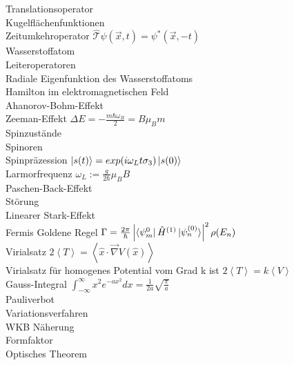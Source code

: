 \documentclass{article}
\begin{document}
Translationsoperator \\

Kugelfl\"achenfunktionen \\

Zeitumkehroperator $\hat{\mathcal{T}}\psi(\vec{x}, t) = \psi^*(\vec{x}, -t)$\\

Wasserstoffatom \\

Leiteroperatoren \\

Radiale Eigenfunktion des Wasserstoffatoms \\

Hamilton im elektromagnetischen Feld \\

Ahanorov-Bohm-Effekt \\

Zeeman-Effekt $\Delta E = - \frac{m \hbar \omega_B}{2} = B \mu_B m$ \\

Spinzust\"ande \\

Spinoren \\

Spinpr\"azession $\ket{s(t)} = exp(i \omega_L t \sigma_3) \ket{s(0)} $ \\

Larmorfrequenz $\omega_L := \frac{g}{2 \hbar} \mu_B B$ \\

Paschen-Back-Effekt \\

St\"orung \\

Linearer Stark-Effekt \\

Fermis Goldene Regel $\Gamma = \frac{2\pi}{\hbar} \left| \bra{\psi_m^{0}} \hat{H}^{(1)} \ket{\psi_n^{(0)}} \right|^2 \rho(E_n) $\\

Virialsatz $2 \left< T \right> = \left< \hat{x} \cdot \vec{\nabla}V(\hat{x}) \right> $ \\

Virialsatz f\"ur homogenes Potential vom Grad k ist $2 \left< T \right> = k \left< V \right> $ \\

Gauss-Integral $ \int_{-\infty}^{\infty}x^2e^{-ax^2} dx = \frac{1}{2a} \sqrt{\frac{\pi}{a}}$ \\

Pauliverbot \\

Variationsverfahren \\

WKB N\"aherung \\

Formfaktor \\

Optisches Theorem \\
\end{document}
